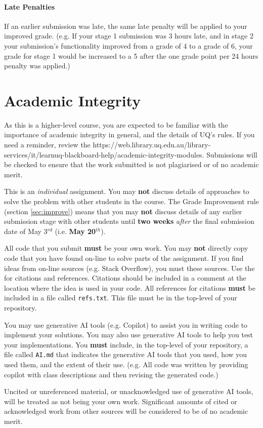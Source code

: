 \documentclass{csse4400}
\begin{document}
\paragraph{Late Penalties}
If an earlier submission was late, the same late penalty will be applied to your improved grade.
(e.g. If your stage 1 submission was 3 hours late, and in stage 2 your submission's functionality improved from a grade of 4 to a grade of 6,
your grade for stage 1 would be increased to a 5 after the one grade point per 24 hours penalty was applied.)

\section{Academic Integrity}
As this is a higher-level course, you are expected to be familiar with the importance of academic integrity in general, and the details of UQ's rules.
If you need a reminder, review the  {https://web.library.uq.edu.au/library-services/it/learnuq-blackboard-help/academic-integrity-modules}.
Submissions will be checked to ensure that the work submitted is not plagiarised or of no academic merit.

This is an \textit{individual} assignment. You may \textbf{not} discuss details of approaches to solve the problem with other students in the course.
The Grade Improvement rule (section \ref{sec:improve}) means that you may \textbf{not} discuss details of any earlier submission stage with other students
until \textbf{two weeks} \textit{after} the final submission date of May 3$^{rd}$ (i.e. \textbf{May 20$^{th}$}).

All code that you submit \textbf{must} be your own work. You may \textbf{not} directly copy code that you have found on-line to solve parts of the assignment. If you find ideas from on-line sources (e.g. Stack Overflow), you must  these sources. Use the  for citations and references. Citations should be included in a comment at the location where the idea is used in your code. All references for citations \textbf{must} be included in a file called \texttt{refs.txt}. This file must be in the top-level of your repository.

You may use generative AI tools (e.g. Copilot) to assist you in writing code to implement your solutions. You may also use generative AI tools to help you test your implementations. You \textbf{must} include, in the top-level of your repository, a file called \texttt{AI.md} that indicates the generative AI tools that you used, how you used them, and the extent of their use. (e.g. All code was written by providing copilot with class descriptions and then revising the generated code.)

Uncited or unreferenced material, or unacknowledged use of generative AI tools, will be treated as not being your own work. Significant amounts of cited or acknowledged work from other sources will be considered to be of no academic merit.





\end{document}
